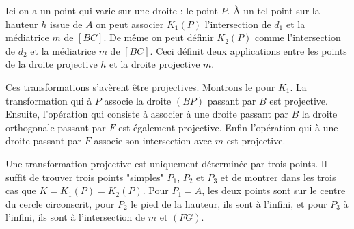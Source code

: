 \begin{sol}
Ici on a un point qui varie sur une droite : le point $P$. À un tel point sur la hauteur $h$ issue de $A$ on peut associer $K_1(P)$ l'intersection de $d_1$ et la médiatrice $m$ de $[BC]$. De même on peut définir $K_2(P)$ comme l'intersection de $d_2$ et la médiatrice $m$ de $[BC]$. Ceci définit deux applications entre les points de la droite projective $h$ et la droite projective $m$.

\medskip

Ces transformations s'avèrent être projectives. Montrons le pour $K_1$. La transformation qui à $P$ associe la droite $(BP)$ passant par $B$ est projective. Ensuite, l'opération qui consiste à associer à une droite passant par $B$ la droite orthogonale passant par $F$ est également projective. Enfin l'opération qui à une droite passant par $F$ associe son intersection avec $m$ est projective.

\medskip

Une transformation projective est uniquement déterminée par trois points. Il suffit de trouver trois points "simples" $P_1$, $P_2$ et $P_3$ et de montrer dans les trois cas que $K = K_1(P) = K_2(P)$. Pour $P_1 = A$, les deux points sont sur le centre du cercle circonscrit, pour $P_2$ le pied de la hauteur, ils sont à l'infini, et pour $P_3$ à l'infini, ils sont à l'intersection de $m$ et $(FG)$.
\end{sol}


